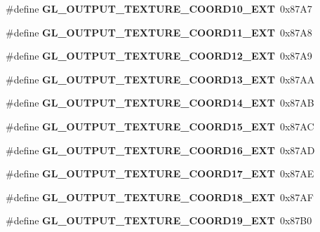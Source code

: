 \begin{DoxyCompactItemize}
\item 
\#define {\bfseries G\+L\+\_\+\+O\+U\+T\+P\+U\+T\+\_\+\+T\+E\+X\+T\+U\+R\+E\+\_\+\+C\+O\+O\+R\+D10\+\_\+\+E\+X\+T}~0x87\+A7\label{_s_d_l__opengl_8h_aaaa128c5c030ca7585e0c2eacaa17e50}

\item 
\#define {\bfseries G\+L\+\_\+\+O\+U\+T\+P\+U\+T\+\_\+\+T\+E\+X\+T\+U\+R\+E\+\_\+\+C\+O\+O\+R\+D11\+\_\+\+E\+X\+T}~0x87\+A8\label{_s_d_l__opengl_8h_aafa4f7b9b9df9f0011d87fbe3ab71294}

\item 
\#define {\bfseries G\+L\+\_\+\+O\+U\+T\+P\+U\+T\+\_\+\+T\+E\+X\+T\+U\+R\+E\+\_\+\+C\+O\+O\+R\+D12\+\_\+\+E\+X\+T}~0x87\+A9\label{_s_d_l__opengl_8h_a1403f2a0e9db502f0a56bfed923b145b}

\item 
\#define {\bfseries G\+L\+\_\+\+O\+U\+T\+P\+U\+T\+\_\+\+T\+E\+X\+T\+U\+R\+E\+\_\+\+C\+O\+O\+R\+D13\+\_\+\+E\+X\+T}~0x87\+A\+A\label{_s_d_l__opengl_8h_aa8c20bd82b1de72bdc2c27dad156252a}

\item 
\#define {\bfseries G\+L\+\_\+\+O\+U\+T\+P\+U\+T\+\_\+\+T\+E\+X\+T\+U\+R\+E\+\_\+\+C\+O\+O\+R\+D14\+\_\+\+E\+X\+T}~0x87\+A\+B\label{_s_d_l__opengl_8h_a2e94df051e7ba423605df49675125b3e}

\item 
\#define {\bfseries G\+L\+\_\+\+O\+U\+T\+P\+U\+T\+\_\+\+T\+E\+X\+T\+U\+R\+E\+\_\+\+C\+O\+O\+R\+D15\+\_\+\+E\+X\+T}~0x87\+A\+C\label{_s_d_l__opengl_8h_a26bff66828114371202b2a09d9ce2f59}

\item 
\#define {\bfseries G\+L\+\_\+\+O\+U\+T\+P\+U\+T\+\_\+\+T\+E\+X\+T\+U\+R\+E\+\_\+\+C\+O\+O\+R\+D16\+\_\+\+E\+X\+T}~0x87\+A\+D\label{_s_d_l__opengl_8h_a08e30ed81d78a69cbffd61d3f079b98c}

\item 
\#define {\bfseries G\+L\+\_\+\+O\+U\+T\+P\+U\+T\+\_\+\+T\+E\+X\+T\+U\+R\+E\+\_\+\+C\+O\+O\+R\+D17\+\_\+\+E\+X\+T}~0x87\+A\+E\label{_s_d_l__opengl_8h_aed2ef78dcea5d212154ae16917238fea}

\item 
\#define {\bfseries G\+L\+\_\+\+O\+U\+T\+P\+U\+T\+\_\+\+T\+E\+X\+T\+U\+R\+E\+\_\+\+C\+O\+O\+R\+D18\+\_\+\+E\+X\+T}~0x87\+A\+F\label{_s_d_l__opengl_8h_a52b98726418d67dcba5923ba09987fe2}

\item 
\#define {\bfseries G\+L\+\_\+\+O\+U\+T\+P\+U\+T\+\_\+\+T\+E\+X\+T\+U\+R\+E\+\_\+\+C\+O\+O\+R\+D19\+\_\+\+E\+X\+T}~0x87\+B0\label{_s_d_l__opengl_8h_a934df7c07fc7eddea7be2c63ea2cf900}


\end{DoxyCompactItemize}
